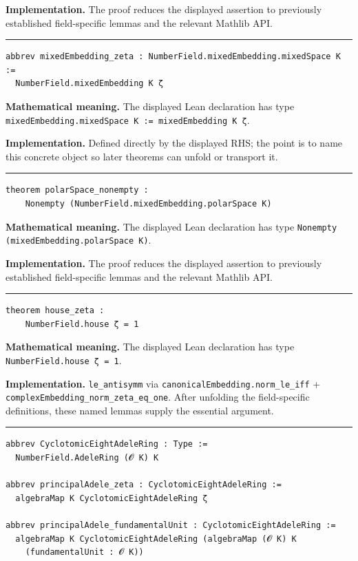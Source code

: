 \documentclass[UTF8,a4paper,11pt,fontset=fandol]{ctexart}
\theoremstyle{definition}
\newcommand{\statementsep}{\par\medskip\hrule\medskip}
\begin{document}
\noindent\textbf{Implementation.} The proof reduces the displayed assertion to previously established field-specific lemmas and the relevant Mathlib API.\par
\statementsep
\begin{verbatim}
abbrev mixedEmbedding_zeta : NumberField.mixedEmbedding.mixedSpace K :=
  NumberField.mixedEmbedding K ζ
\end{verbatim}
\noindent\textbf{Mathematical meaning.} The displayed Lean declaration has type \texttt{mixedEmbedding.\allowbreak{}mixedSpace K := mixedEmbedding K ζ}.\par
\noindent\textbf{Implementation.} Defined directly by the displayed RHS; the point is to name this concrete object so later theorems can unfold or transport it.\par
\statementsep
\begin{verbatim}
theorem polarSpace_nonempty :
    Nonempty (NumberField.mixedEmbedding.polarSpace K)
\end{verbatim}
\noindent\textbf{Mathematical meaning.} The displayed Lean declaration has type \texttt{Nonempty (mixedEmbedding.\allowbreak{}polarSpace K)}.\par
\noindent\textbf{Implementation.} The proof reduces the displayed assertion to previously established field-specific lemmas and the relevant Mathlib API.\par
\statementsep
\begin{verbatim}
theorem house_zeta :
    NumberField.house ζ = 1
\end{verbatim}
\noindent\textbf{Mathematical meaning.} The displayed Lean declaration has type \texttt{NumberField.\allowbreak{}house ζ = 1}.\par
\noindent\textbf{Implementation.} \texttt{le\_\allowbreak{}antisymm} via \texttt{canonicalEmbedding.\allowbreak{}norm\_\allowbreak{}le\_\allowbreak{}iff} + \texttt{complexEmbedding\_\allowbreak{}norm\_\allowbreak{}zeta\_\allowbreak{}eq\_\allowbreak{}one}. After unfolding the field-specific definitions, these named lemmas supply the essential argument.\par
\statementsep
\begin{verbatim}
abbrev CyclotomicEightAdeleRing : Type :=
  NumberField.AdeleRing (𝓞 K) K

abbrev principalAdele_zeta : CyclotomicEightAdeleRing :=
  algebraMap K CyclotomicEightAdeleRing ζ

abbrev principalAdele_fundamentalUnit : CyclotomicEightAdeleRing :=
  algebraMap K CyclotomicEightAdeleRing (algebraMap (𝓞 K) K
    (fundamentalUnit : 𝓞 K))
\end{verbatim}
\end{document}
